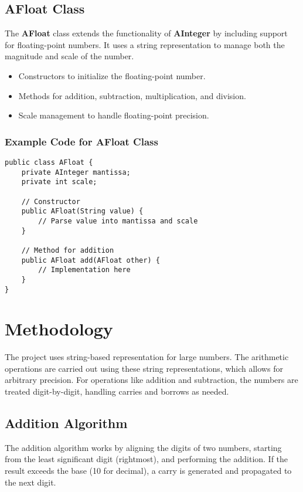 \documentclass[12pt]{article}
\begin{document}
\subsection*{AFloat Class}
The \textbf{AFloat} class extends the functionality of \textbf{AInteger} by including support for floating-point numbers. It uses a string representation to manage both the magnitude and scale of the number.
\begin{itemize}
    \item Constructors to initialize the floating-point number.
    \item Methods for addition, subtraction, multiplication, and division.
    \item Scale management to handle floating-point precision.
\end{itemize}

\subsubsection*{Example Code for AFloat Class}
\begin{verbatim}
public class AFloat {
    private AInteger mantissa;
    private int scale;
    
    // Constructor
    public AFloat(String value) {
        // Parse value into mantissa and scale
    }
    
    // Method for addition
    public AFloat add(AFloat other) {
        // Implementation here
    }
}
\end{verbatim}

\section*{Methodology}
The project uses string-based representation for large numbers. The arithmetic operations are carried out using these string representations, which allows for arbitrary precision. For operations like addition and subtraction, the numbers are treated digit-by-digit, handling carries and borrows as needed.

\subsection*{Addition Algorithm}
The addition algorithm works by aligning the digits of two numbers, starting from the least significant digit (rightmost), and performing the addition. If the result exceeds the base (10 for decimal), a carry is generated and propagated to the next digit.
\end{document}

